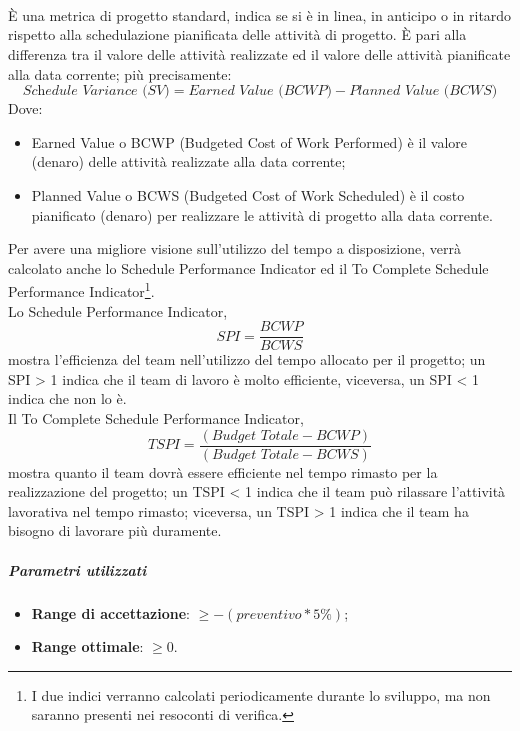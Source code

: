 \documentclass[../PianoDiQualifica.tex]{subfiles}
\begin{document}
				\paragraph{\\}
					È una metrica di progetto standard, indica se si è in linea, in
					anticipo o in ritardo rispetto alla schedulazione pianificata delle
					attività di progetto. È pari alla differenza tra il valore delle
					attività realizzate ed il valore delle attività pianificate alla
					data corrente; più precisamente:
					\begin{equation*}
						\textit{Schedule Variance (SV)} = \textit{Earned Value (BCWP)} - \textit{Planned Value (BCWS)}
					\end{equation*}
					Dove:
					\begin{itemize}
						\item Earned Value o BCWP (Budgeted Cost of Work Performed) è il valore
						(denaro) delle attività realizzate alla data corrente;
						\item Planned Value o BCWS (Budgeted Cost of Work Scheduled) è il costo
						pianificato (denaro) per realizzare le attività di progetto alla
						data corrente.
					\end{itemize}
					Per avere una migliore visione sull'utilizzo del tempo a disposizione, verrà
					calcolato anche lo Schedule Performance Indicator ed il To Complete Schedule
					Performance Indicator\footnote{I due indici verranno calcolati periodicamente
					durante lo sviluppo, ma non saranno presenti nei resoconti di verifica.}.\\
					Lo Schedule Performance Indicator,
					\begin{equation*}
						\textit{SPI} = \frac{\textit{BCWP}}{\textit{BCWS}}
					\end{equation*}
					mostra l'efficienza del team nell'utilizzo del tempo allocato per il progetto;
					un SPI > 1 indica che il team di lavoro è molto efficiente,
					viceversa, un SPI < 1 indica che non lo è.\\
					Il To Complete Schedule Performance Indicator,
					\begin{equation*}
						\textit{TSPI} = \frac{( \textit{Budget Totale} - \textit{BCWP} )}{( \textit{Budget Totale} - \textit{BCWS} )}
					\end{equation*}
					mostra quanto il team dovrà essere efficiente nel tempo rimasto per la
					realizzazione del progetto; un TSPI < 1 indica che il team può rilassare
					l'attività lavorativa nel tempo rimasto; viceversa, un TSPI > 1 indica che il
					team ha bisogno di lavorare più duramente.
					\subparagraph{Parametri utilizzati}
						\begin{itemize}
							\item \textbf{Range di accettazione}: $\geq -(preventivo*5\%)$;
							\item \textbf{Range ottimale}: $\geq 0$.
						\end{itemize}
\end{document}
